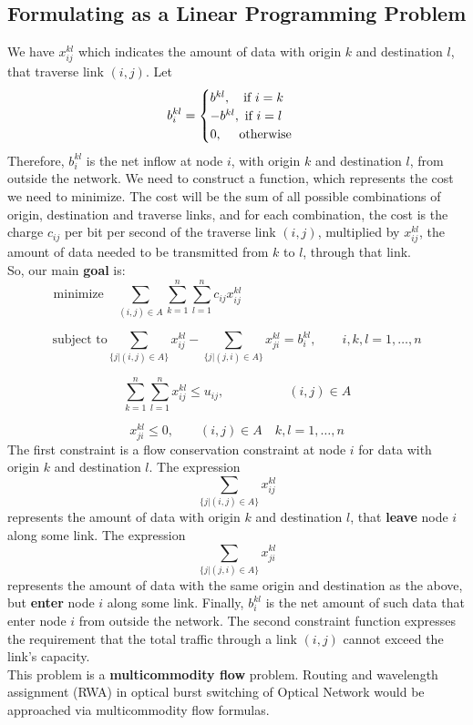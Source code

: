 \documentclass[12pt]{article}
\begin{document}
 \subsection*{Formulating as a Linear Programming Problem}
We have $x_{ij}^{kl}$	which indicates the amount of data with origin $k$ and destination $l$, that traverse link $(i,j)$. Let
$$b_i^{kl} = 
\begin{cases} 
      b^{kl},     \text{\quad  if }   i = k \\
      -b^{kl},    \text{ if }  i = l \\  
      0,            \text{ \quad otherwise}
   \end{cases}$$
Therefore, $b_i^{kl}$ is the net inflow at node $i$, with origin $k$ and destination $l$, from outside the network. We need to construct a function, which represents the cost we need to minimize. The cost will be the sum of all possible combinations of origin, destination and traverse links, and for each combination, the cost is the charge $c_{ij}$ per bit per second of the traverse link $(i,j)$, multiplied by $x_{ij}^{kl}$, the amount of data needed to be transmitted from $k$ to $l$, through that link.\\
 So, our main \textbf{goal} is:
\begin{equation*}
\text{minimize} \quad \sum_{(i,j) \in A} \sum_{k=1}^{n} \sum_{l=1}^{n}{c_{ij}x_{ij}^{kl}} \quad \qquad \qquad \qquad \qquad \qquad \qquad \quad
\end{equation*}

\begin{equation*}
 \text{subject to} \sum_{\lbrace j| (i,j) \in A\rbrace}{x_{ij}^{kl}} - \sum_{\lbrace j| (j,i) \in A\rbrace}x_{ji}^{kl} = b_i^{kl}, \qquad i,k,l=1,\ldots,n 
\end{equation*}

\begin{equation*}
\sum_{k=1}^n\sum_{l=1}^n x_{ij}^{kl} \leqslant u_{ij}, \qquad  \qquad \quad (i,j) \in A
\end{equation*}

\begin{equation*}
x_{ji}^{kl} \leqslant 0, \qquad (i,j) \in A \quad  k,l = 1,\ldots, n
\end{equation*}
The first constraint is a flow conservation constraint at node $i$ for data with origin $k$ and destination $l$. The expression 
$$\sum_{\lbrace j| (i,j) \in A\rbrace}{x_{ij}^{kl}}$$ represents the amount of data with origin $k$ and destination $l$, that \textbf{leave} node $i$ along some link. The expression $$\sum_{\lbrace j| (j,i) \in A\rbrace}x_{ji}^{kl}$$ represents the amount of data with the same origin and destination as the above, but \textbf{enter} node $i$ along some link. Finally, $b_i^{kl}$ is the net amount of such data that enter node $i$ from outside the network. The second constraint function expresses the requirement that the total traffic through a link $(i,j)$ cannot exceed the link's capacity.  \\
This problem is a \textbf{multicommodity flow} problem. Routing and wavelength assignment (RWA) in optical burst switching of Optical Network would be approached via multicommodity flow formulas.
\newpage
\end{document}

